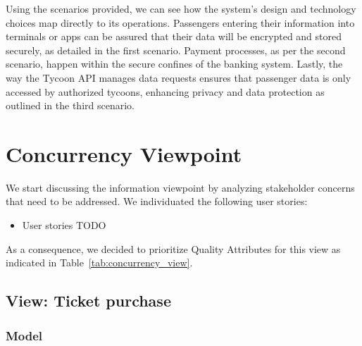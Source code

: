 Using the scenarios provided, we can see how the system's design and technology choices map directly to its operations. Passengers entering their information into terminals or apps can be assured that their data will be encrypted and stored securely, as detailed in the first scenario. Payment processes, as per the second scenario, happen within the secure confines of the banking system. Lastly, the way the Tycoon API manages data requests ensures that passenger data is only accessed by authorized tycoons, enhancing privacy and data protection as outlined in the third scenario.
\section{Concurrency Viewpoint}
We start discussing the information viewpoint by analyzing stakeholder concerns that need to be addressed.
We individuated the following user stories:
\begin{itemize}
    \item User stories TODO
\end{itemize}

As a consequence, we decided to prioritize Quality Attributes for this view as indicated in Table~\ref{tab:concurrency_view}.
\begin{table}[h!]
    \centering
    \caption{Concurrency View Prioritized Quality Attributes}
    \label{tab:concurrency_view}
\end{table}

\subsection{View: Ticket purchase}
\subsubsection{Model}

